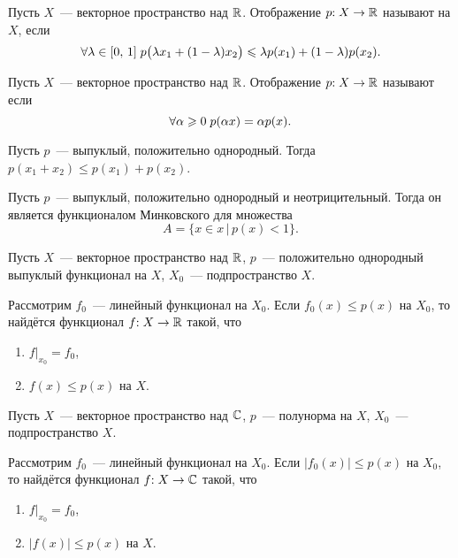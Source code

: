 \documentclass{notes}
\begin{document}
	\begin{de}
		Пусть $X$~--- векторное пространство над $\mathbb{R}$. Отображение $p\text{\text{:}} \; X \to \mathbb{R}$ называют  на $X$, если 
		\[
			\forall \lambda \in [0, \, 1] \; p\big(\lambda x_1 + (1 - \lambda) x_2\big) \leqslant \lambda p(x_1) + (1 - \lambda) p(x_2).  
		\]
	\end{de}

	\begin{de}
		Пусть $X$~--- векторное пространство над $\mathbb{R}$. Отображение $p\text{\text{:}} \; X \to \mathbb{R}$ называют  если 
		\[
			\forall \alpha \geqslant 0 \; p(\alpha x) = \alpha p(x).
		\]
	\end{de}

	\begin{st}
		Пусть $p$~--- выпуклый, положительно однородный. Тогда $p(x_1 + x_2) \leqslant p(x_1) + p(x_2)$.
	\end{st}

	\begin{st}
		Пусть $p$~--- выпуклый, положительно однородный и неотрицительный. Тогда он является функционалом Минковского для множества 
		\[
			A = \{x \in x \, | \, p(x) < 1\}.
		\]
	\end{st}

	\begin{thm} \label{thm:ch-ban-R}
		Пусть $X$~--- векторное пространство над $\mathbb{R}$, $p$~--- положительно однородный выпуклый функционал на $X$, $X_0$~--- подпространство $X$.

		Рассмотрим $f_0$~--- линейный функционал на $X_0$. Если $f_0(x) \leqslant p(x)$ на $X_0$, то найдётся функционал $f\text{\text{:}} \; X \to \mathbb{R}$ такой, что
		\begin{enumerate}
			\item $f|_{x_0} = f_0$,
			\item $f(x) \leqslant p(x)$ на $X$.
		\end{enumerate}
	\end{thm}


	\begin{thm} \label{thm:ch-ban-C}
		Пусть $X$~--- векторное пространство над $\mathbb{C}$, $p$~--- полунорма на $X$, $X_0$~--- подпространство $X$.

		Рассмотрим $f_0$~--- линейный функционал на $X_0$. Если $|f_0(x)| \leqslant p(x)$ на $X_0$, то найдётся функционал $f\text{\text{:}} \; X \to \mathbb{C}$ такой, что
		\begin{enumerate}
			\item $f|_{x_0} = f_0$,
			\item $|f(x)| \leqslant p(x)$ на $X$.
		\end{enumerate}
	\end{thm}
\end{document}
